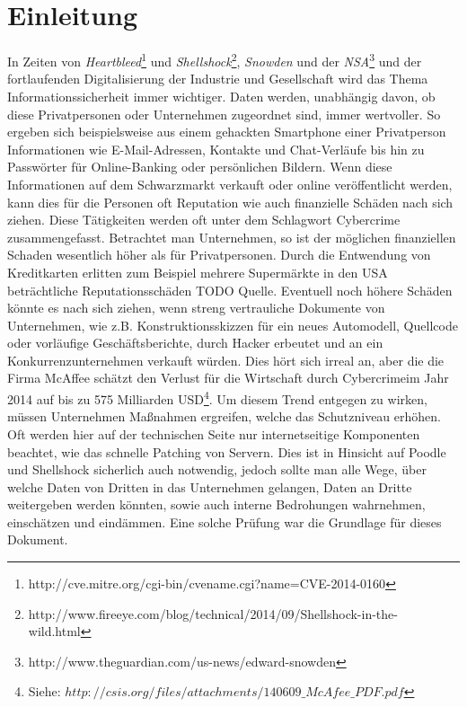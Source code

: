 \chapter{Einleitung}
In Zeiten von \textit{Heartbleed}\footnote{http://cve.mitre.org/cgi-bin/cvename.cgi?name=CVE-2014-0160} und \textit{Shellshock}\footnote{http://www.fireeye.com/blog/technical/2014/09/Shellshock-in-the-wild.html}, \textit{Snowden} und der \textit{NSA}\footnote{http://www.theguardian.com/us-news/edward-snowden} und der fortlaufenden Digitalisierung der Industrie und Gesellschaft wird das Thema Informationssicherheit immer wichtiger. Daten werden, unabhängig davon, ob diese Privatpersonen oder Unternehmen zugeordnet sind, immer wertvoller. So ergeben sich beispielsweise aus einem gehackten Smartphone einer Privatperson Informationen wie E-Mail-Adressen, Kontakte und Chat-Verläufe bis hin zu Passwörter für Online-Banking oder persönlichen Bildern. Wenn diese Informationen auf dem Schwarzmarkt verkauft oder online veröffentlicht werden, kann dies für die Personen oft Reputation wie auch finanzielle Schäden nach sich ziehen. Diese Tätigkeiten werden oft unter dem Schlagwort Cybercrime zusammengefasst. Betrachtet man Unternehmen, so ist der möglichen finanziellen Schaden wesentlich höher als für Privatpersonen. Durch die Entwendung von Kreditkarten erlitten zum Beispiel mehrere Supermärkte in den USA beträchtliche Reputationsschäden TODO Quelle. Eventuell noch höhere Schäden könnte es nach sich ziehen, wenn streng vertrauliche Dokumente von Unternehmen, wie z.B. Konstruktionsskizzen für ein neues Automodell, Quellcode oder vorläufige Geschäftsberichte, durch Hacker erbeutet und an ein Konkurrenzunternehmen verkauft würden. Dies hört sich irreal an, aber die die Firma McAffee schätzt den Verlust für die Wirtschaft durch \glqq Cybercrime\grqq im Jahr 2014 auf bis zu 575 Milliarden USD\footnote{Siehe: $http://csis.org/files/attachments/140609\_McAfee\_PDF.pdf$}. 
Um diesem Trend entgegen zu wirken, müssen Unternehmen Maßnahmen ergreifen, welche das Schutzniveau erhöhen. Oft werden hier auf der technischen Seite nur internetseitige Komponenten beachtet, wie das schnelle Patching von Servern. Dies ist in Hinsicht auf  Poodle und Shellshock sicherlich auch notwendig, jedoch sollte man alle Wege, über welche Daten von Dritten in das Unternehmen gelangen, Daten an Dritte weitergeben werden könnten, sowie auch interne Bedrohungen wahrnehmen, einschätzen und eindämmen. Eine solche Prüfung war die Grundlage für dieses Dokument.